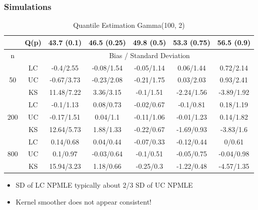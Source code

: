 \documentclass[compress,red]{beamer}
\begin{document}
\begin{frame}

\frametitle{Simulations}


\begin{table}

\begin{center}
\caption{Quantile Estimation Gamma(100, 2)}

\begin{footnotesize}

\begin{tabular} {| c | c | c | c | c | c | c | } 

	 \hline
	&Q(p)&	43.7 (0.1)&	46.5 (0.25)&	49.8 (0.5)&	53.3 (0.75)&	56.5 (0.9) \\ 
 \hline 
 	n & & \multicolumn{5}{|c|}{Bias / Standard Deviation} 
 \\ 
 \hline 
\multirow{3}{*}{50}		&	LC	&-0.4/2.55	&-0.08/1.54	&-0.05/1.14	&0.06/1.44	&0.72/2.14\\ 
			&	UC	&-0.67/3.73	&-0.23/2.08	&-0.21/1.75	&0.03/2.03	&0.93/2.41\\ 
			&	KS	&11.48/7.22	&3.36/3.15	&-0.1/1.51	&-2.24/1.56	&-3.89/1.92\\ 
	\hline 
\multirow{3}{*}{200}		&	LC	&-0.1/1.13	&0.08/0.73	&-0.02/0.67	&-0.1/0.81	&0.18/1.19\\ 
			&	UC	&-0.17/1.51	&0.04/1.1	&-0.11/1.06	&-0.01/1.23	&0.14/1.82\\ 
			&	KS	&12.64/5.73	&1.88/1.33	&-0.22/0.67	&-1.69/0.93	&-3.83/1.6\\ 
	\hline 
\multirow{3}{*}{800}		&	LC	&0.14/0.68	&0.04/0.44	&-0.07/0.33	&-0.12/0.44	&0/0.61\\ 
			&	UC	&0.1/0.97	&-0.03/0.64	&-0.1/0.51	&-0.05/0.75	&-0.04/0.98\\ 
			&	KS	&15.94/3.23	&1.18/0.66	&-0.25/0.3	&-1.22/0.48	&-4.57/1.35\\ 
	\hline 


\end{tabular}
\end{footnotesize}
\end{center}

\end{table}

\begin{itemize}

	\item SD of LC NPMLE typically about 2/3 SD of UC NPMLE

	\item Kernel smoother does not appear consistent!

\end{itemize}

\end{frame}
\end{document}
